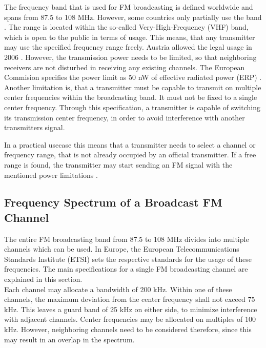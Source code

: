The frequency band that is used for FM broadcasting is defined worldwide and spans from 87.5 to 108 MHz.
However, some countries only partially use the band \cite[RR5-39]{ItuRadioRegulations}.
The range is located within the so-called Very-High-Frequency (VHF) band, which is open to the public in terms of usage.
This means, that any transmitter may use the specified frequency range freely.
Austria allowed the legal usage in 2006 \cite{AustriaRundfunkgesetz2014}.
However, the transmission power needs to be limited, so that neighboring receivers are not disturbed in receiving any existing channels.
The European Commision specifies the power limit as 50 nW of effective radiated power (ERP) \cite{EuCommissionRadioSpectrumHarmonization}.
Another limitation is, that a transmitter must be capable to transmit on multiple center frequencies within the broadcasting band.
It must not be fixed to a single center frequency.
Through this specification, a transmitter is capable of switching its transmission center frequency, in order to avoid interference with another transmitters signal.

In a practical usecase this means that a transmitter needs to select a channel or frequency range, that is not already occupied by an official transmitter.
If a free range is found, the transmitter may start sending an FM signal with the mentioned power limitations \cite{EbuFmRegulators}.



\subsection{Frequency Spectrum of a Broadcast FM Channel}

The entire FM broadcasting band from 87.5 to 108 MHz divides into multiple channels which can be used.
In Europe, the European Telecommunications Standards Institute (ETSI) sets the respective standards for the usage of these frequencies.
The main specifications for a single FM broadcasting channel are explained in this section.\\

Each channel may allocate a bandwidth of 200 kHz.
Within one of these channels, the maximum deviation from the center frequency shall not exceed 75 kHz.
This leaves a guard band of 25 kHz on either side, to minimize interference with adjacent channels.
Center frequencies may be allocated on multiples of 100 kHz.
However, neighboring channels need to be considered therefore, since this may result in an overlap in the spectrum.\\

